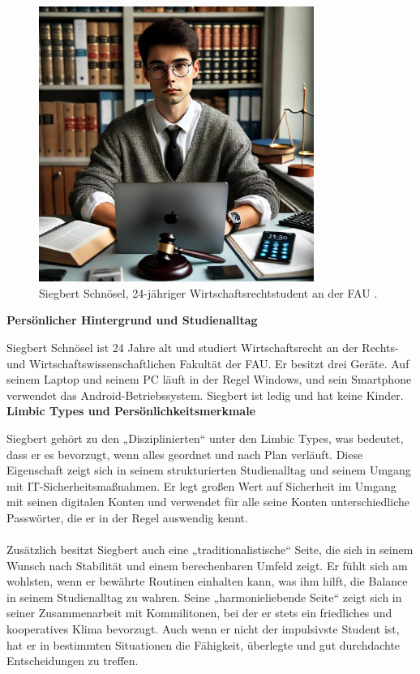 \documentclass[german,report]{i1thesis}
\begin{document}
\begin{figure}[H]
\centering
\includegraphics[width=0.8\textwidth]{images/lukas_fischer.pdf}
\caption{Siegbert Schnösel, 24-jähriger Wirtschaftsrechtstudent an der FAU \cite{chatgpt2024lukasfischer}.}
\label{fig}
\end{figure}

\textbf{Persönlicher Hintergrund und Studienalltag}

Siegbert Schnösel ist 24 Jahre alt und studiert Wirtschaftsrecht an der Rechts- und Wirtschaftswissenschaftlichen Fakultät der FAU. Er besitzt drei Geräte. Auf seinem Laptop und seinem PC läuft in der Regel Windows, und sein Smartphone verwendet das Android-Betriebssystem. Siegbert ist ledig und hat keine Kinder.\\

\textbf{Limbic Types und Persönlichkeitsmerkmale}

Siegbert gehört zu den „Disziplinierten“ unter den Limbic Types, was bedeutet, dass er es bevorzugt, wenn alles geordnet und nach Plan verläuft. Diese Eigenschaft zeigt sich in seinem strukturierten Studienalltag und seinem Umgang mit IT-Sicherheitsmaßnahmen. Er legt großen Wert auf Sicherheit im Umgang mit seinen digitalen Konten und verwendet für alle seine Konten unterschiedliche Passwörter, die er in der Regel auswendig kennt.\\
\\
Zusätzlich besitzt Siegbert auch eine „traditionalistische“ Seite, die sich in seinem Wunsch nach Stabilität und einem berechenbaren Umfeld zeigt. Er fühlt sich am wohlsten, wenn er bewährte Routinen einhalten kann, was ihm hilft, die Balance in seinem Studienalltag zu wahren. Seine „harmonieliebende Seite“ zeigt sich in seiner Zusammenarbeit mit Kommilitonen, bei der er stets ein friedliches und kooperatives Klima bevorzugt. Auch wenn er nicht der impulsivste Student ist, hat er in bestimmten Situationen die Fähigkeit, überlegte und gut durchdachte Entscheidungen zu treffen.
\end{document}
